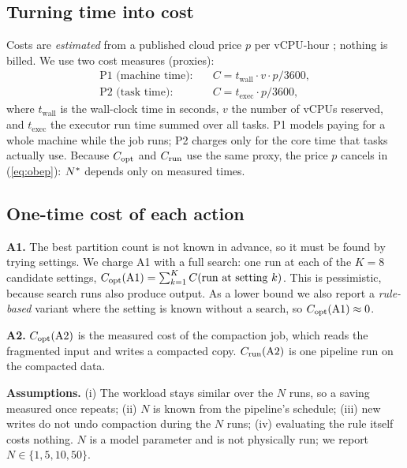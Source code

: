 \subsection{Turning time into cost}
Costs are \emph{estimated} from a published cloud price $p$ per vCPU-hour
\cite{aws2026ec2pricing}; nothing is billed. We use two cost measures (proxies):
\begin{align}
  \text{P1 (machine time):}\quad & C = t_{\mathrm{wall}} \cdot v \cdot p / 3600, \label{eq:p1}\\
  \text{P2 (task time):}\quad & C = t_{\mathrm{exec}} \cdot p / 3600, \label{eq:p2}
\end{align}
where $t_{\mathrm{wall}}$ is the wall-clock time in seconds, $v$ the number of vCPUs reserved,
and $t_{\mathrm{exec}}$ the executor run time summed over all tasks. P1 models paying for a
whole machine while the job runs; P2 charges only for the core time that tasks actually use.
Because $C_{\mathrm{opt}}$ and $C_{\mathrm{run}}$ use the same proxy, the price $p$ cancels in (\ref{eq:obep}):
$N^{*}$ depends only on measured times.

\subsection{One-time cost of each action}
\textbf{A1.} The best partition count is not known in advance, so it must be found by trying
settings. We charge A1 with a full search: one run at each of the $K = 8$ candidate settings,
$C_{\mathrm{opt}}(\mathrm{A1}) = \sum_{k=1}^{K} C(\text{run at setting } k)$. This is pessimistic, because
search runs also produce output. As a lower bound we also report a \emph{rule-based} variant
where the setting is known without a search, so $C_{\mathrm{opt}}(\mathrm{A1}) \approx 0$.

\textbf{A2.} $C_{\mathrm{opt}}(\mathrm{A2})$ is the measured cost of the compaction job, which reads the
fragmented input and writes a compacted copy. $C_{\mathrm{run}}(\mathrm{A2})$ is one pipeline run on the
compacted data.

\textbf{Assumptions.} (i) The workload stays similar over the $N$ runs, so a saving measured
once repeats; (ii) $N$ is known from the pipeline's schedule; (iii) new writes do not undo
compaction during the $N$ runs; (iv) evaluating the rule itself costs nothing. $N$ is a model
parameter and is not physically run; we report $N \in \{1, 5, 10, 50\}$.
